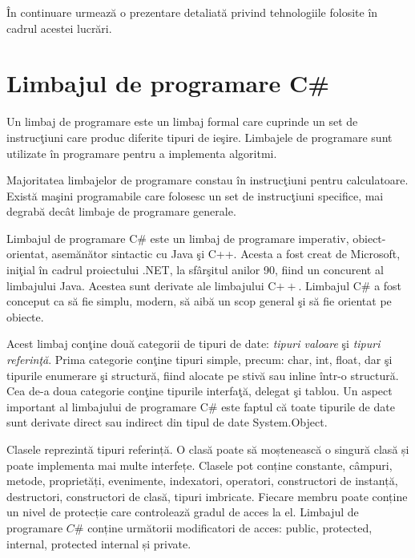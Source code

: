 \^{I}n continuare urmeaz\u{a} o prezentare detaliat\u{a} privind tehnologiile folosite \^{i}n cadrul acestei lucr\u{a}ri.

\section{Limbajul de programare C{\#}}

	Un limbaj de programare este un limbaj formal care cuprinde un set de instruc\c{t}iuni care produc diferite tipuri de ie\c{s}ire. Limbajele de programare sunt utilizate în programare pentru a implementa algoritmi.	 
	
	Majoritatea limbajelor de programare constau \^{i}n instruc\c{t}iuni pentru calculatoare. Exist\u{a} ma\c{s}ini programabile care folosesc un set de instruc\c{t}iuni specifice, mai degrab\u{a} dec\^{a}t limbaje de programare generale.	 
	
	Limbajul de programare C{\#} este un limbaj de programare imperativ, obiect-orientat, asem\u{a}n\u{a}tor sintactic cu Java \c{s}i C++. Acesta a fost creat de Microsoft, ini\c{t}ial \^{i}n cadrul proiectului .NET, la sf\^{a}r\c{s}itul anilor 90, fiind un concurent al limbajului Java. Acestea sunt derivate ale limbajului C$++$. Limbajul C{\#} a fost conceput ca s\u{a} fie simplu, modern,	s\u{a} aib\u{a} un scop general \c{s}i s\u{a} fie orientat pe obiecte.
	 	
	Acest limbaj con\c{t}ine dou\u{a} categorii de tipuri de date: \textit{tipuri valoare} \c{s}i \textit{tipuri referin\c{t}\u{a}}. Prima categorie con\c{t}ine tipuri simple, precum: char, int, float, dar \c{s}i tipurile enumerare \c{s}i structur\u{a}, fiind alocate pe stiv\u{a} sau inline \^{i}ntr-o structur\u{a}. Cea de-a doua categorie con\c{t}ine tipurile interfa\c{t}\u{a}, delegat \c{s}i tablou. Un aspect important al limbajului de programare C{\#} este faptul c\u{a} toate tipurile de date sunt derivate direct sau indirect din tipul de date System.Object.
	
	Clasele reprezintă tipuri referință. O clasă poate să moștenească o singură clasă și poate implementa mai multe interfețe. Clasele pot conține constante, câmpuri, metode, proprietăți, evenimente, indexatori, operatori, constructori de instanță, destructori, constructori de clasă, tipuri imbricate. Fiecare membru poate conține un nivel de protecție care controlează gradul de acces la el. Limbajul de programare $C\#$ conține următorii modificatori de acces: public, protected, internal, protected internal și private.
	
